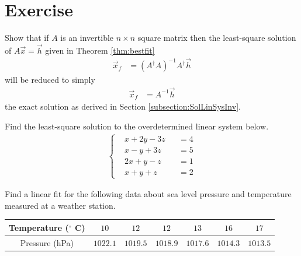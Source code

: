 \section{Exercise}

\begin{Exercise}
Show that if $A$ is an invertible $n \times n$ square matrix then the least-square solution of $A\vec{x} = \vec{h}$ given in Theorem \ref{thm:bestfit}
\begin{align*}
\vec{x}_f &= (A^\dag A)^{-1}A^\dag \vec{h}    
\end{align*}
will be reduced to simply
\begin{align*}
\vec{x}_f &= A^{-1}\vec{h}    
\end{align*}
the exact solution as derived in Section \ref{subsection:SolLinSysInv}.
\end{Exercise}

\begin{Exercise}
Find the least-square solution to the overdetermined linear system below.
\begin{align*}
\left\{\begin{alignedat}{2}
&x + 2y - 3z &&= 4 \\
&x - y + 3z &&= 5 \\
&2x + y - z &&= 1 \\
&x + y + z &&= 2
\end{alignedat}\right.
\end{align*}
\end{Exercise}

\begin{Exercise}
Find a linear fit for the following data about sea level pressure and temperature measured at a weather station.
\begin{center}
\begin{tabular}{|c|c|c|c|c|c|c|}
\hline
Temperature ($^\circ$ C) & $10$ & $12$ & $12$ & $13$ & $16$ & $17$\\
\hline
Pressure (hPa) & $1022.1$ & $1019.5$ & $1018.9$ & $1017.6$ & $1014.3$ & $1013.5$\\
\hline
\end{tabular}
\end{center}
\end{Exercise}

